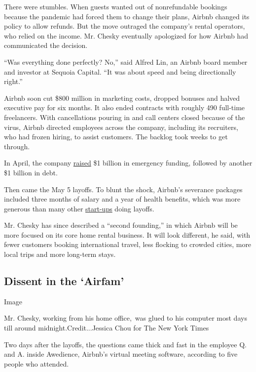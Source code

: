There were stumbles. When guests wanted out of nonrefundable bookings
because the pandemic had forced them to change their plans, Airbnb
changed its policy to allow refunds. But the move outraged the company's
rental operators, who relied on the income. Mr. Chesky eventually
apologized for how Airbnb had communicated the decision.

``Was everything done perfectly? No,'' said Alfred Lin, an Airbnb board
member and investor at Sequoia Capital. ``It was about speed and being
directionally right.''

Airbnb soon cut \$800 million in marketing costs, dropped bonuses and
halved executive pay for six months. It also ended contracts with
roughly 490 full-time freelancers. With cancellations pouring in and
call centers closed because of the virus, Airbnb directed employees
across the company, including its recruiters, who had frozen hiring, to
assist customers. The backlog took weeks to get through.

In April, the company
\href{https://www.nytimes.com/2020/04/06/technology/airbnb-coronavirus-valuation.html}{raised}
\$1 billion in emergency funding, followed by another \$1 billion in
debt.

Then came the May 5 layoffs. To blunt the shock, Airbnb's severance
packages included three months of salary and a year of health benefits,
which was more generous than many other
\href{https://www.nytimes.com/2020/04/01/technology/virus-start-ups-pummeled-layoffs-unwinding.html}{start-ups}
doing layoffs.

Mr. Chesky has since described a ``second founding,'' in which Airbnb
will be more focused on its core home rental business. It will look
different, he said, with fewer customers booking international travel,
less flocking to crowded cities, more local trips and more long-term
stays.

\hypertarget{dissent-in-the-airfam}{%
\subsection{Dissent in the `Airfam'}\label{dissent-in-the-airfam}}

Image

Mr. Chesky, working from his home office,~was glued to his computer most
days till around midnight.Credit...Jessica Chou for The New York Times

Two days after the layoffs, the questions came thick and fast in the
employee Q. and A. inside Awedience, Airbnb's virtual meeting software,
according to five people who attended.

